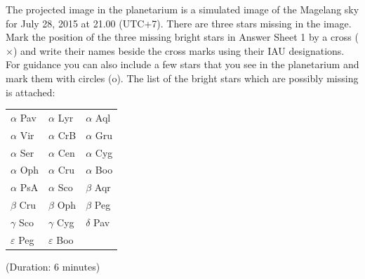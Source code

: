 The projected image in the planetarium is a simulated image of the Magelang
sky for July 28, 2015 at 21.00 (UTC+7). There are three stars missing in the
image. Mark the position of the three missing bright stars in Answer Sheet 1
by a cross ($\times$) and write their names beside the cross marks using
their IAU designations. For guidance you can also include a few stars that
you see in the planetarium and mark them with circles (o). The list of the
bright stars which are possibly missing is attached:

\begin{center}
\begin{tabular}{lll}
$\alpha$ Pav & $\alpha$ Lyr & $\alpha$ Aql \\
$\alpha$ Vir & $\alpha$ CrB & $\alpha$ Gru \\
$\alpha$ Ser & $\alpha$ Cen & $\alpha$ Cyg \\
$\alpha$ Oph & $\alpha$ Cru & $\alpha$ Boo \\
$\alpha$ PsA & $\alpha$ Sco & $\beta$ Aqr \\
$\beta$ Cru & $\beta$ Oph & $\beta$ Peg \\
$\gamma$ Sco & $\gamma$ Cyg & $\delta$ Pav \\
$\varepsilon$ Peg & $\varepsilon$ Boo & \\
\end{tabular}
\end{center}

(Duration: 6 minutes)

